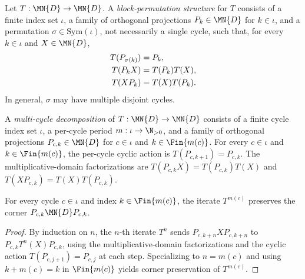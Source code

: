 \begin{definition}
    \label{def:cycle_structure}
    \leanok
    Let $T:\MN{D}\to\MN{D}$. A \emph{block-permutation structure} for
    $T$ consists of a finite index set $\iota$, a family of orthogonal
    projections $P_k\in\MN{D}$ for $k\in\iota$, and a permutation
    $\sigma\in\mathrm{Sym}(\iota)$, not necessarily a single cycle, such
    that, for every $k\in\iota$ and $X\in\MN{D}$,
    \begin{align}
        T(P_{\sigma(k)})&=P_k, \notag\\
        T(P_kX)&=T(P_k)T(X), \notag\\
        T(XP_k)&=T(X)T(P_k).
        \notag
    \end{align}
    In general, $\sigma$ may have multiple disjoint cycles.
\end{definition}

\begin{definition}
    \label{def:multi_cycle_decomposition}
    \leanok
    A \emph{multi-cycle decomposition} of $T:\MN{D}\to\MN{D}$ consists of
    a finite cycle index set $\iota$, a per-cycle period
    $m:\iota\to\N_{>0}$, and a family of orthogonal projections
    $P_{c,k}\in\MN{D}$ for $c\in\iota$ and $k\in\Fin{m(c)}$. For every
    $c\in\iota$ and $k\in\Fin{m(c)}$, the per-cycle cyclic action is
    $T(P_{c,k+1})=P_{c,k}$. The multiplicative-domain factorizations are
    $T(P_{c,k}X)=T(P_{c,k})T(X)$ and
    $T(XP_{c,k})=T(X)T(P_{c,k})$.
\end{definition}

\begin{lemma}
    \label{thm:multi_cycle_preserves_corner_pow_period}
    \leanok
    For every cycle $c\in\iota$ and index $k\in\Fin{m(c)}$, the
    iterate $T^{m(c)}$ preserves the corner $P_{c,k}\MN{D}P_{c,k}$.
\end{lemma}

\begin{proof}
    \leanok
    By induction on $n$, the $n$-th iterate $T^n$ sends
    $P_{c,k+n}XP_{c,k+n}$ to $P_{c,k}T^n(X)P_{c,k}$, using the
    multiplicative-domain factorizations and the cyclic action
    $T(P_{c,j+1})=P_{c,j}$ at each step. Specializing to $n=m(c)$ and using
    $k+m(c)=k$ in $\Fin{m(c)}$ yields corner preservation of $T^{m(c)}$.
\end{proof}

